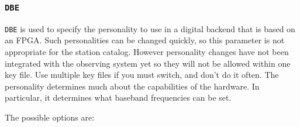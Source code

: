 \documentclass{report}
\begin{document}
\subsubsection{\label{SP:DBE}{\tt DBE}}

{\tt DBE} is used to specify the personality to use in a digital
backend that is based on an FPGA.  Such personalities can be changed
quickly, so this parameter is not appropriate for the station catalog.
However personality changes have not been integrated with the observing
system yet so they will not be allowed within one key file.  Use 
multiple key files if you must switch, and don't do it often.
The personality determines much about the capabilities of the hardware.
In particular, it determines what baseband frequencies can be set.

The possible options are:
\end{document}

